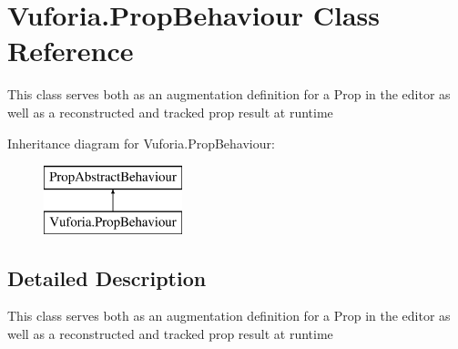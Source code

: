 \hypertarget{class_vuforia_1_1_prop_behaviour}{}\section{Vuforia.\+Prop\+Behaviour Class Reference}
\label{class_vuforia_1_1_prop_behaviour}


This class serves both as an augmentation definition for a Prop in the editor as well as a reconstructed and tracked prop result at runtime  


Inheritance diagram for Vuforia.\+Prop\+Behaviour\+:\begin{figure}[H]
\begin{center}
\leavevmode
\includegraphics[height=2.000000cm]{class_vuforia_1_1_prop_behaviour}
\end{center}
\end{figure}


\subsection{Detailed Description}
This class serves both as an augmentation definition for a Prop in the editor as well as a reconstructed and tracked prop result at runtime 


